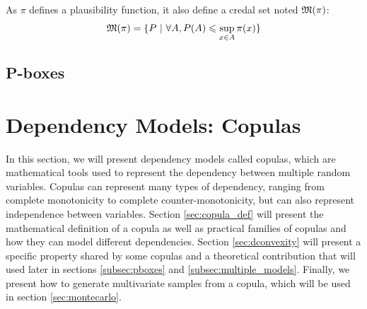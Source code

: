 As \( \pi \) defines a plausibility function, it also define a credal set noted \( {\mathfrak{M}}(\pi) \):
\begin{align}
    {\mathfrak{M}}(\pi)=\{P~|~\forall A, P(A)\leqslant \sup_{x\in A}\pi(x)\}\label{eq:credal_set_possibility}
\end{align}

\subsection{P-boxes}\label{sec:pboxes}

\section{Dependency Models: Copulas}\label{sec:copulas}
In this section, we will present dependency models called copulas, which are mathematical tools used to represent the dependency between multiple random variables. Copulas can represent many types of dependency, ranging from complete monotonicity to complete counter-monotonicity, but can also represent independence between variables. Section \ref{sec:copula_def} will present the mathematical definition of a copula as well as practical families of copulas and how they can model different dependencies. Section \ref{sec:dconvexity} will present a specific property shared by some copulas and a theoretical contribution that will used later in sections \ref{subsec:pboxes} and \ref{subsec:multiple_models}. Finally, we present how to generate multivariate samples from a copula, which will be used in section \ref{sec:montecarlo}.

